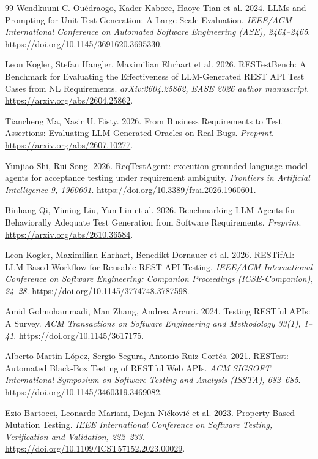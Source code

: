 \documentclass[sigconf,nonacm]{acmart}
\begin{document}
\begin{thebibliography}{99}
 Wendkuuni C. Ou\'{e}draogo, Kader Kabore, Haoye Tian et al. 2024. LLMs and Prompting for Unit Test Generation: A Large-Scale Evaluation. \emph{IEEE/ACM International Conference on Automated Software Engineering (ASE), 2464--2465}. \url{https://doi.org/10.1145/3691620.3695330}.

 Leon Kogler, Stefan Hangler, Maximilian Ehrhart et al. 2026. RESTestBench: A Benchmark for Evaluating the Effectiveness of LLM-Generated REST API Test Cases from NL Requirements. \emph{arXiv:2604.25862, EASE 2026 author manuscript}. \url{https://arxiv.org/abs/2604.25862}.

 Tiancheng Ma, Nasir U. Eisty. 2026. From Business Requirements to Test Assertions: Evaluating LLM-Generated Oracles on Real Bugs. \emph{Preprint}. \url{https://arxiv.org/abs/2607.10277}.

 Yunjiao Shi, Rui Song. 2026. ReqTestAgent: execution-grounded language-model agents for acceptance testing under requirement ambiguity. \emph{Frontiers in Artificial Intelligence 9, 1960601}. \url{https://doi.org/10.3389/frai.2026.1960601}.

 Binhang Qi, Yiming Liu, Yun Lin et al. 2026. Benchmarking LLM Agents for Behaviorally Adequate Test Generation from Software Requirements. \emph{Preprint}. \url{https://arxiv.org/abs/2610.36584}.

 Leon Kogler, Maximilian Ehrhart, Benedikt Dornauer et al. 2026. RESTifAI: LLM-Based Workflow for Reusable REST API Testing. \emph{IEEE/ACM International Conference on Software Engineering: Companion Proceedings (ICSE-Companion), 24--28}. \url{https://doi.org/10.1145/3774748.3787598}.

 Amid Golmohammadi, Man Zhang, Andrea Arcuri. 2024. Testing RESTful APIs: A Survey. \emph{ACM Transactions on Software Engineering and Methodology 33(1), 1--41}. \url{https://doi.org/10.1145/3617175}.

 Alberto Mart\'{i}n-López, Sergio Segura, Antonio Ruiz-Cort\'{e}s. 2021. RESTest: Automated Black-Box Testing of RESTful Web APIs. \emph{ACM SIGSOFT International Symposium on Software Testing and Analysis (ISSTA), 682--685}. \url{https://doi.org/10.1145/3460319.3469082}.

 Ezio Bartocci, Leonardo Mariani, Dejan Ni\v{c}kovi\'{c} et al. 2023. Property-Based Mutation Testing. \emph{IEEE International Conference on Software Testing, Verification and Validation, 222--233}. \url{https://doi.org/10.1109/ICST57152.2023.00029}.


\end{thebibliography}
\end{document}
